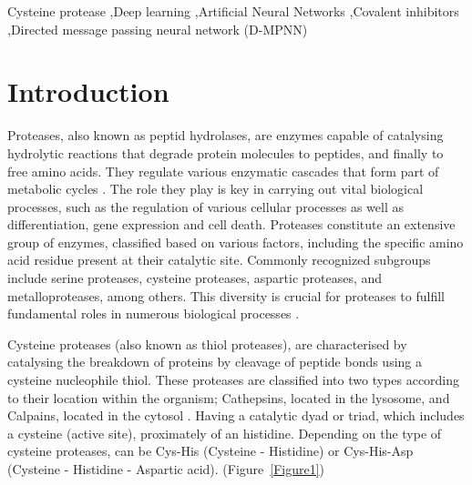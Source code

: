 \documentclass[final,times,twocolumn,article]{elsarticle}
\begin{document}
\begin{frontmatter}
\begin{keyword}
Cysteine protease \sep Deep learning \sep Artificial Neural Networks \sep Covalent inhibitors \sep Directed message passing neural network (D-MPNN)



\end{keyword}


\end{frontmatter}




\section{Introduction}

Proteases, also known as peptid hydrolases, are enzymes capable of catalysing hydrolytic reactions that degrade protein molecules to peptides, and finally to free amino acids. They regulate various enzymatic cascades that form part of metabolic cycles \cite{Ramos2019}. The role they play is key in carrying out vital biological processes, such as the regulation of various cellular processes as well as differentiation, gene expression and cell death. Proteases constitute an extensive group of enzymes, classified based on various factors, including the specific amino acid residue present at their catalytic site. Commonly recognized subgroups include serine proteases, cysteine proteases, aspartic proteases, and metalloproteases, among others. This diversity is crucial for proteases to fulfill fundamental roles in numerous biological processes \cite{Ramos2019}.

Cysteine proteases (also known as thiol proteases), are characterised by catalysing the breakdown of proteins by cleavage of peptide bonds using a cysteine nucleophile thiol. These proteases are classified into two types according to their location within the organism; Cathepsins, located in the lysosome, and Calpains, located in the cytosol \cite{Gupta2020}. Having a catalytic dyad or triad, which includes a cysteine (active site), proximately of an histidine. Depending on the type of cysteine proteases, can be Cys-His (Cysteine - Histidine) or Cys-His-Asp (Cysteine - Histidine - Aspartic acid)\cite{Nicholson2013}. (Figure~\ref{Figure1}) 
\end{document}
